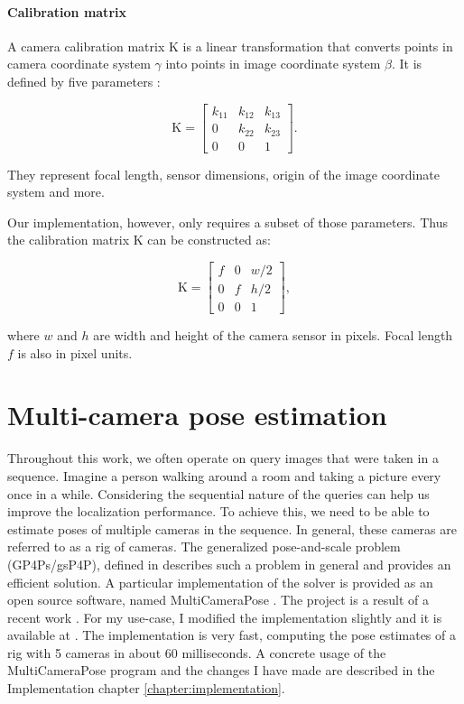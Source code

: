 \documentclass[twoside]{ctuthesis}
\theoremstyle{plain}
\theoremstyle{definition}
\theoremstyle{note}
\newcommand{\code}[1]{{\ttfamily #1%
}}
\begin{document}
\paragraph{Calibration matrix}
A camera calibration matrix K is a linear transformation that converts points in camera coordinate system $\gamma$ into points in image coordinate system $\beta$. It is defined by five parameters \cite{GVG}:

\begin{equation}
	\text{K} = \begin{bmatrix}
		k_{11} & k_{12} & k_{13} \\
		0 & k_{22} & k_{23} \\
		0 & 0 & 1
		\end{bmatrix}.
\end{equation}

They represent focal length, sensor dimensions, origin of the image coordinate system and more.

Our implementation, however, only requires a subset of those parameters. Thus the calibration matrix K can be constructed as:

\begin{equation}
	\text{K} = \begin{bmatrix}
		f & 0 & w/2 \\
		0 & f & h/2 \\
		0 & 0 & 1
		\end{bmatrix},
\end{equation}

where $w$ and $h$ are width and height of the camera sensor in pixels. Focal length $f$ is also in pixel units.

\section{Multi-camera pose estimation}

Throughout this work, we often operate on query images that were taken in a sequence. Imagine a person walking around a room and taking a picture every once in a while. Considering the sequential nature of the queries can help us improve the localization performance. To achieve this, we need to be able to estimate poses of multiple cameras in the sequence. In general, these cameras are referred to as a rig of cameras. The generalized pose-and-scale problem (GP4Ps/gsP4P), defined in \cite{Kukelova2016CVPR} describes such a problem in general and provides an efficient solution. A particular implementation of the solver is provided as an open source software, named \code{MultiCameraPose}. The project is a result of a recent work \cite{MultiCameraPosePaper}. For my use-case, I modified the implementation slightly and it is available at \cite{MultiCameraPose}. The implementation is very fast, computing the pose estimates of a rig with 5 cameras in about 60 milliseconds. A concrete usage of the \code{MultiCameraPose} program and the changes I have made are described in the Implementation chapter \ref{chapter:implementation}.
\end{document}

